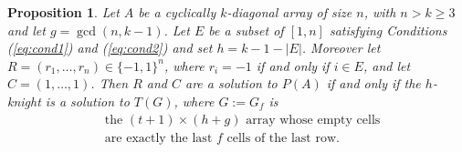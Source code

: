 \documentclass{amsart}
\newtheorem{prop}{Proposition}[section]
\theoremstyle{definition}
\numberwithin{equation}{section}
\begin{document}
\begin{prop} \label{thm:main_eqv}
Let $A$ be a cyclically $k$-diagonal array of size $n$, with $n>k \geq 3$ and let $g= \gcd(n,k-1)$. Let $E$ be a subset of $[1,n]$ satisfying Conditions (\ref{eq:cond1}) and (\ref{eq:cond2}) and set $h=k-1-|E|$. Moreover let $R = (r_1,\dotsc, r_n) \in \{-1,1\}^n$, where $r_i = -1$ if and only if $i \in E$, and let $C = (1,\dotsc,1)$. Then $R$ and $C$ are a solution to $P(A)$ if and only if the $h$-knight is a solution to $T(G)$, where $G:=G_f$ is
\begin{equation} \label{eq:procedureD}
\begin{aligned}
&\text{the\ $(t+1)\times (h+g)$\ array\ whose\ empty\ cells}\\
&\text{are\ exactly\ the\ last\ $f$\ cells\ of\ the\ last\ row.}
\end{aligned}
\end{equation}
\end{prop}
\end{document}
